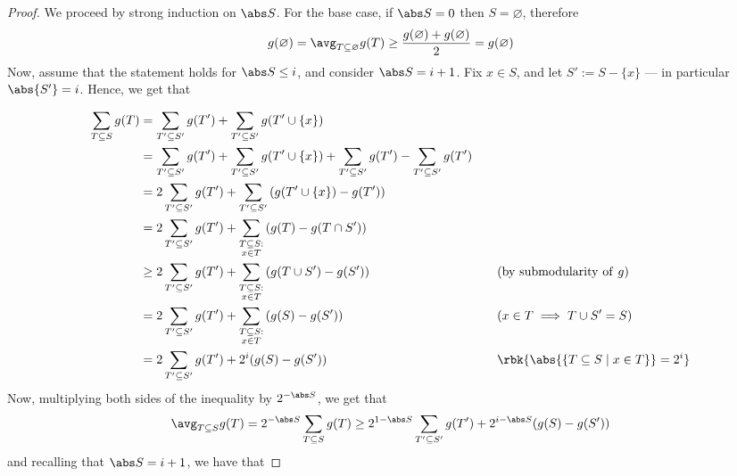 \documentclass[a4paper, 12pt]{report}
\begin{document}
    \begin{proof}
        We proceed by strong induction on $\abs S$. For the base case, if $\abs S = 0$ then $S = \varnothing$, therefore $$g(\varnothing) = \avg_{T \subseteq \varnothing}{g(T)} \ge \dfrac{g(\varnothing) + g(\varnothing)}{2} = g(\varnothing)$$ Now, assume that the statement holds for $\abs S \le i$, and consider $\abs S = i + 1$. Fix $x \in S$, and let $S' := S - \{x\}$ --- in particular $\abs{S'} = i$. Hence, we get that

        \begin{equation*}
            \begin{alignedat}{2}
                \sum_{T \subseteq S}{g(T)} &= \sum_{T' \subseteq S'}{g(T')} + \sum_{T' \subseteq S'}{g(T' \cup \{x\})} && \\
                                           &= \sum_{T' \subseteq S'}{g(T')} + \sum_{T' \subseteq S'}{g(T' \cup \{x\})} + \sum_{T' \subseteq S'}{g(T')} - \sum_{T' \subseteq S'}{g(T')} && \\
                                           &= 2\sum_{T' \subseteq S'}{g(T')} + \sum_{T' \subseteq S'}{(g(T' \cup \{x\}) - g(T'))} && \\
                                           &= 2\sum_{T' \subseteq S'}{g(T')} + \sum_{\substack{T \subseteq S : \\ x \in T}}{(g(T) - g(T \cap S'))} && \\
                                           &\ge 2\sum_{T' \subseteq S'}{g(T')} + \sum_{\substack{T \subseteq S : \\ x \in T}}{(g(T \cup S') - g(S'))} && \quad \quad (\mathrm{by \ submodularity \ of} \ g) \\
                                           &= 2\sum_{T' \subseteq S'}{g(T')} + \sum_{\substack{T \subseteq S : \\ x \in T}}{(g(S) - g(S'))} && \quad \quad (x \in T \implies T \cup S' = S) \\
                                           &= 2\sum_{T' \subseteq S'}{g(T')} + 2^i(g(S) - g(S')) && \quad \quad \rbk{\abs{\{T \subseteq S \mid x \in T\}} = 2^i} \\
            \end{alignedat}
        \end{equation*}
        Now, multiplying both sides of the inequality by $2^{- \abs S}$, we get that $$\avg_{T \subseteq S}{g(T)} = 2^{- \abs S}\sum_{T \subseteq S}{g(T)} \ge 2 ^{1 - \abs S}\sum_{T' \subseteq S'}{g(T')} + 2^{i - \abs S}(g(S) - g(S'))$$ and recalling that $\abs S = i + 1$, we have that

\end{proof}
\end{document}
